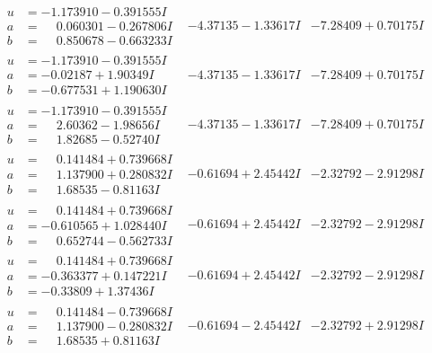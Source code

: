 \documentclass[1p]{elsarticle_modified}
\theoremstyle{definition}
\begin{document}
$$\begin{array}{c|c|c}
\begin{aligned}
u &= -1.173910 - 0.391555 I \\
a &= \phantom{-}0.060301 - 0.267806 I \\
b &= \phantom{-}0.850678 - 0.663233 I\end{aligned}
 & -4.37135 - 1.33617 I & -7.28409 + 0.70175 I \\ \hline\begin{aligned}
u &= -1.173910 - 0.391555 I \\
a &= -0.02187 + 1.90349 I \\
b &= -0.677531 + 1.190630 I\end{aligned}
 & -4.37135 - 1.33617 I & -7.28409 + 0.70175 I \\ \hline\begin{aligned}
u &= -1.173910 - 0.391555 I \\
a &= \phantom{-}2.60362 - 1.98656 I \\
b &= \phantom{-}1.82685 - 0.52740 I\end{aligned}
 & -4.37135 - 1.33617 I & -7.28409 + 0.70175 I \\ \hline\begin{aligned}
u &= \phantom{-}0.141484 + 0.739668 I \\
a &= \phantom{-}1.137900 + 0.280832 I \\
b &= \phantom{-}1.68535 - 0.81163 I\end{aligned}
 & -0.61694 + 2.45442 I & -2.32792 - 2.91298 I \\ \hline\begin{aligned}
u &= \phantom{-}0.141484 + 0.739668 I \\
a &= -0.610565 + 1.028440 I \\
b &= \phantom{-}0.652744 - 0.562733 I\end{aligned}
 & -0.61694 + 2.45442 I & -2.32792 - 2.91298 I \\ \hline\begin{aligned}
u &= \phantom{-}0.141484 + 0.739668 I \\
a &= -0.363377 + 0.147221 I \\
b &= -0.33809 + 1.37436 I\end{aligned}
 & -0.61694 + 2.45442 I & -2.32792 - 2.91298 I \\ \hline\begin{aligned}
u &= \phantom{-}0.141484 - 0.739668 I \\
a &= \phantom{-}1.137900 - 0.280832 I \\
b &= \phantom{-}1.68535 + 0.81163 I\end{aligned}
 & -0.61694 - 2.45442 I & -2.32792 + 2.91298 I \\ \hline\begin{aligned}

\end{aligned}
\end{array}$$
\end{document}

